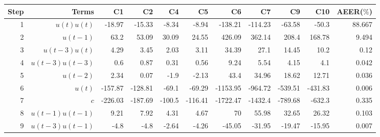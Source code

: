 \begin{tabular}{rrrrrrrrrrr}
Step & Terms & C1 & C2 & C4 & C5 & C6 & C7 & C9 & C10 & AEER($\%$) \\ 
\hline 
1 & $u(t)u(t)$ & -18.97 & -15.33 & -8.34 & -8.94 & -138.21 & -114.23 & -63.58 & -50.3 & 88.667 \\ 
2 & $u(t-1)$ & 63.2 & 53.09 & 30.09 & 24.55 & 426.09 & 362.14 & 208.4 & 168.78 & 9.494 \\ 
3 & $u(t-3)u(t)$ & 4.29 & 3.45 & 2.03 & 3.11 & 34.39 & 27.1 & 14.45 & 10.2 & 0.12 \\ 
4 & $u(t-3)u(t-3)$ & 0.6 & 0.87 & 0.31 & 0.56 & 9.24 & 5.54 & 4.15 & 4.1 & 0.042 \\ 
5 & $u(t-2)$ & 2.34 & 0.07 & -1.9 & -2.13 & 43.4 & 34.96 & 18.62 & 12.71 & 0.036 \\ 
6 & $u(t)$ & -157.87 & -128.81 & -69.1 & -69.29 & -1153.95 & -964.72 & -539.51 & -431.83 & 0.006 \\ 
7 & $c$ & -226.03 & -187.69 & -100.5 & -116.41 & -1722.47 & -1432.4 & -789.68 & -632.3 & 0.335 \\ 
8 & $u(t-1)u(t-1)$ & 9.21 & 7.92 & 4.31 & 4.67 & 70 & 55.98 & 32.65 & 26.32 & 0.103 \\ 
9 & $u(t-3)u(t-1)$ & -4.8 & -4.8 & -2.64 & -4.26 & -45.05 & -31.95 & -19.47 & -15.95 & 0.007 \\ 
\hline 
\end{tabular}